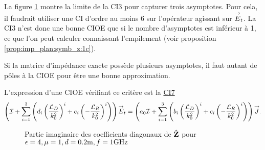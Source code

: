       \FloatBarrier


      La figure \ref{fig:imp_fourier:plan:triple_asymptote:hoibc} montre la limite de la CI3 pour capturer trois asymptotes. Pour cela, il faudrait utiliser une CI d'ordre au moins 6 sur l'opérateur agissant sur \({\overset{\rightarrow}{E}}_t\).
      La CI3 n'est donc une bonne CIOE que si le nombre d'asymptotes est inférieur à 1, ce que l'on peut calculer connaissant l'empilement (voir proposition \ref{prop:imp_plan:symb_z:1c}).

      Si la matrice d'impédance exacte possède plusieurs asymptotes, il faut autant de pôles à la CIOE pour être une bonne approximation.

      L'expression d'une CIOE vérifiant ce critère est la \hyperlink{ci7}{CI7}
      \begin{equation}
        \left({\mathcal{I}} + \sum_{i=1}^3 \left(d_{i} \left(\dfrac{{\mathcal{L}_D}}{k_0^2}\right)^i + e_{i} \left(-\dfrac{{\mathcal{L}_R}}{k_0^2}\right)^i \right)\right){\overset{\rightarrow}{E}}_t = \left(a_0 {\mathcal{I}} + \sum_{i=1}^3 \left(b_{i} \left(\dfrac{{\mathcal{L}_D}}{k_0^2}\right)^i + c_{i} \left(-\dfrac{{\mathcal{L}_R}}{k_0^2}\right)^i \right)\right){\overset{\rightarrow}{J}}.
      \end{equation}

      \begin{figure}[!hbt]
          \centering
          
          \caption[Partie imaginaire de l'opérateur de Calderón, comparé avec les approximations CI0, CI3 pour une couche plane de matériau sans pertes, avec triple asymptote]{Partie imaginaire des coefficients diagonaux de \(\hat{\mathbf{Z}}\) pour \(\epsilon = 4, \mu = 1, d=0.2\text{m}, f=1\text{GHz}\)}
          \label{fig:imp_fourier:plan:triple_asymptote:hoibc}
      \end{figure}


